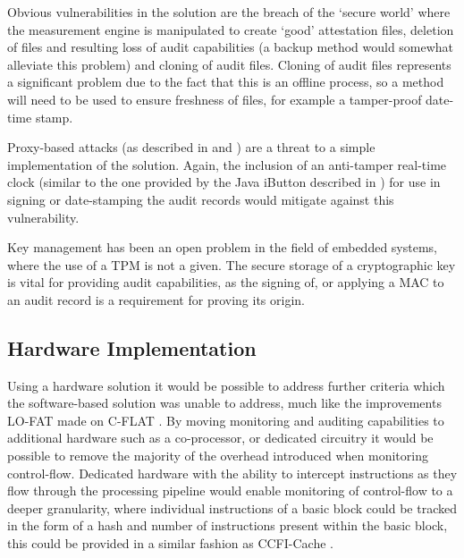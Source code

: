 Obvious vulnerabilities in the solution are the breach of the `secure world' where the measurement engine is manipulated to create `good' attestation files, deletion of files and resulting loss of audit capabilities (a backup method would somewhat alleviate this problem) and cloning of audit files. Cloning of audit files represents a significant problem due to the fact that this is an offline process, so a method will need to be used to ensure freshness of files, for example a tamper-proof date-time stamp.

Proxy-based attacks (as described in \cite{Seshadri2007} and \cite{Li2011}) are a threat to a simple implementation of the solution. Again, the inclusion of an anti-tamper real-time clock (similar to the one provided by the Java iButton described in \cite{Chong2003}) for use in signing or date-stamping the audit records would mitigate against this vulnerability.

Key management has been an open problem in the field of embedded systems, where the use of a TPM is not a given. The secure storage of a cryptographic key is vital for providing audit capabilities, as the signing of, or applying a MAC to an audit record is a requirement for proving its origin.

\subsection{Hardware Implementation}
Using a hardware solution it would be possible to address further criteria which the software-based solution was unable to address, much like the improvements LO-FAT\cite{Dessouky2017} made on C-FLAT \cite{Abera2016}. By moving monitoring and auditing capabilities to additional hardware such as a co-processor, or dedicated circuitry it would be possible to remove the majority of the overhead introduced when monitoring control-flow. Dedicated hardware with the ability to intercept instructions as they flow through the processing pipeline would enable monitoring of control-flow to a deeper granularity, where individual instructions of a basic block could be tracked in the form of a hash and number of instructions present within the basic block, this could be provided in a similar fashion as CCFI-Cache \cite{Danger2018}.
